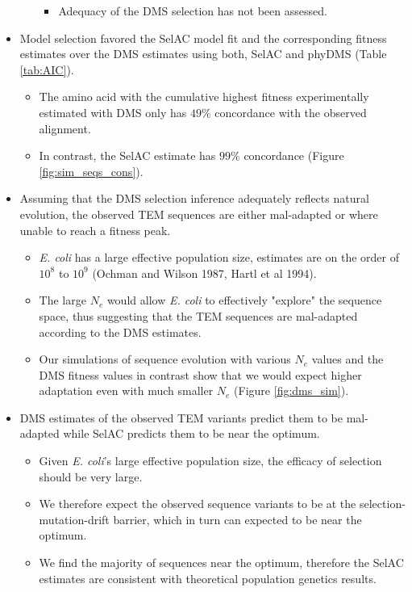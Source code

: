 \documentclass[12pt]{article}
\begin{document}
\begin{itemize}
\begin{itemize}
\begin{itemize}
			\item Adequacy of the DMS selection has not been assessed.
		\end{itemize}
	\end{itemize}
	\item Model selection favored the SelAC model fit and the corresponding fitness estimates over the DMS estimates using both, SelAC and phyDMS (Table \ref{tab:AIC}).
	\begin{itemize}	
		\item The amino acid with the cumulative highest fitness experimentally estimated with DMS only has $49 \%$ concordance with the observed alignment.
		\item In contrast, the SelAC estimate has $99 \%$ concordance (Figure \ref{fig:sim_seqs_cons}). 
	\end{itemize}
	\item Assuming that the DMS selection inference adequately reflects natural evolution, the observed TEM sequences are either mal-adapted or where unable to reach a fitness peak.
	\begin{itemize}
		\item \textit{E. coli} has a large effective population size, estimates are on the order of $10^8$ to $10^9$ (Ochman and Wilson 1987, Hartl et al 1994).
		\item The large $N_e$ would allow \textit{E. coli} to effectively "explore" the sequence space, thus suggesting that the TEM sequences are mal-adapted according to the DMS estimates.
		\item Our simulations of sequence evolution with various $N_e$ values and the DMS fitness values in contrast show that we would expect higher adaptation even with much smaller $N_e$ (Figure \ref{fig:dms_sim}).
	\end{itemize}
	\item DMS estimates of the observed TEM variants predict them to be mal-adapted while SelAC predicts them to be near the optimum.
	\begin{itemize}
		\item Given \textit{E. coli}'s large effective population size, the efficacy of selection should be very large.
		\item We therefore expect the observed sequence variants to be at the selection-mutation-drift barrier, which in turn can expected to be near the optimum.
		\item We find the majority of sequences near the optimum, therefore the SelAC estimates are consistent with theoretical population genetics results.

\end{itemize}
\end{itemize}
\end{document}
